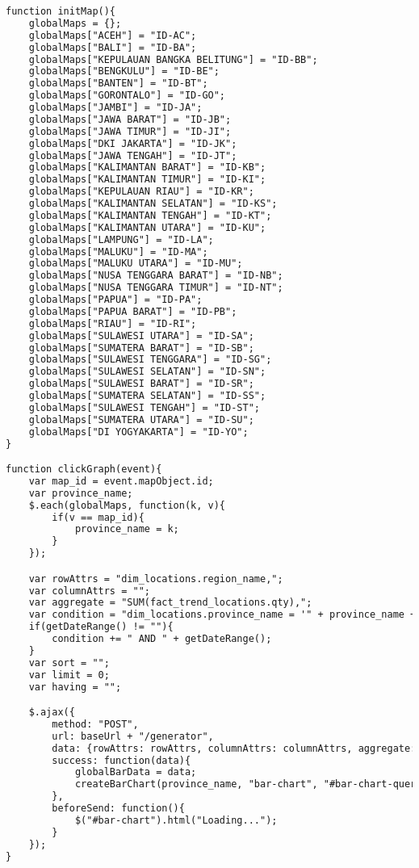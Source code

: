 \begin{lstlisting}[language=HTML,basicstyle=\tiny,caption=script-dashboard.js]
function initMap(){
    globalMaps = {};
    globalMaps["ACEH"] = "ID-AC";
    globalMaps["BALI"] = "ID-BA";
    globalMaps["KEPULAUAN BANGKA BELITUNG"] = "ID-BB";
    globalMaps["BENGKULU"] = "ID-BE";
    globalMaps["BANTEN"] = "ID-BT";
    globalMaps["GORONTALO"] = "ID-GO";
    globalMaps["JAMBI"] = "ID-JA";
    globalMaps["JAWA BARAT"] = "ID-JB";
    globalMaps["JAWA TIMUR"] = "ID-JI";
    globalMaps["DKI JAKARTA"] = "ID-JK";
    globalMaps["JAWA TENGAH"] = "ID-JT";
    globalMaps["KALIMANTAN BARAT"] = "ID-KB";
    globalMaps["KALIMANTAN TIMUR"] = "ID-KI";
    globalMaps["KEPULAUAN RIAU"] = "ID-KR";
    globalMaps["KALIMANTAN SELATAN"] = "ID-KS";
    globalMaps["KALIMANTAN TENGAH"] = "ID-KT";
    globalMaps["KALIMANTAN UTARA"] = "ID-KU";
    globalMaps["LAMPUNG"] = "ID-LA";
    globalMaps["MALUKU"] = "ID-MA";
    globalMaps["MALUKU UTARA"] = "ID-MU";
    globalMaps["NUSA TENGGARA BARAT"] = "ID-NB";
    globalMaps["NUSA TENGGARA TIMUR"] = "ID-NT";
    globalMaps["PAPUA"] = "ID-PA";
    globalMaps["PAPUA BARAT"] = "ID-PB";
    globalMaps["RIAU"] = "ID-RI";
    globalMaps["SULAWESI UTARA"] = "ID-SA";
    globalMaps["SUMATERA BARAT"] = "ID-SB";
    globalMaps["SULAWESI TENGGARA"] = "ID-SG";
    globalMaps["SULAWESI SELATAN"] = "ID-SN";
    globalMaps["SULAWESI BARAT"] = "ID-SR";
    globalMaps["SUMATERA SELATAN"] = "ID-SS";
    globalMaps["SULAWESI TENGAH"] = "ID-ST";
    globalMaps["SUMATERA UTARA"] = "ID-SU";
    globalMaps["DI YOGYAKARTA"] = "ID-YO";
}

function clickGraph(event){
    var map_id = event.mapObject.id;
    var province_name;
    $.each(globalMaps, function(k, v){
        if(v == map_id){
            province_name = k;
        }
    });

    var rowAttrs = "dim_locations.region_name,";
    var columnAttrs = "";
    var aggregate = "SUM(fact_trend_locations.qty),";
    var condition = "dim_locations.province_name = '" + province_name + "'";
    if(getDateRange() != ""){
        condition += " AND " + getDateRange();
    }
    var sort = "";
    var limit = 0;
    var having = "";

    $.ajax({
        method: "POST",
        url: baseUrl + "/generator",
        data: {rowAttrs: rowAttrs, columnAttrs: columnAttrs, aggregate: aggregate, condition: condition, sort: sort, limit: limit, having: having, connectionId: 0, cubeId: 0},
        success: function(data){
            globalBarData = data;
            createBarChart(province_name, "bar-chart", "#bar-chart-query-time", clickBarChart);
        },
        beforeSend: function(){
            $("#bar-chart").html("Loading...");
        }
    });
}


\end{lstlisting}

